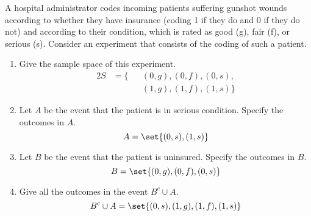 \item A hospital administrator codes incoming patients suffering gunshot wounds according to whether they have insurance (coding 1 if they do and 0 if they do not) and according to their condition, which is rated as good (g), fair (f), or serious (s). Consider an experiment that consists of the coding of such a patient.
\begin{enumerate}
    \item Give the sample space of this experiment.
    \begin{alignat*}{2}
        S &= \{&&(0,g),(0,f),(0,s),\\
        &&&(1,g),(1,f),(1,s)\}
    \end{alignat*}
    \item Let $A$ be the event that the patient is in serious condition. Specify the outcomes in $A$.
    \[ A = \set{(0,s),(1,s)} \]
    \item Let $B$ be the event that the patient is uninsured. Specify the outcomes in $B$.
    \[ B = \set{(0,g),(0,f),(0,s)} \]
    \item Give all the outcomes in the event $B^c \cup A$.
    \[ B^c \cup A = \set{(0,s),(1,g),(1,f),(1,s)} \]
\end{enumerate}